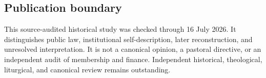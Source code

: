 \subsection{Publication boundary}

This source-audited historical study was checked through 16 July 2026. It distinguishes public law, institutional self-description, later reconstruction, and unresolved interpretation. It is not a canonical opinion, a pastoral directive, or an independent audit of membership and finance. Independent historical, theological, liturgical, and canonical review remains outstanding.
